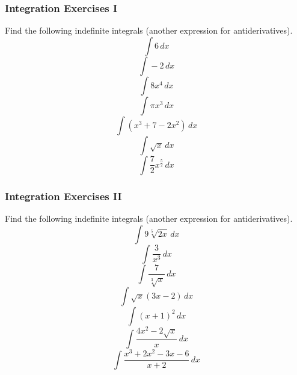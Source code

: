 \documentclass[xcolor=dvipsnames]{beamer}
\begin{document}
\begin{frame}
  \frametitle{Integration Exercises I}
Find the following \alert{indefinite integrals} (another expression
for antiderivatives). 
\begin{equation}
  \label{eq:eevoomoh}
  \int{}6\,dx
\end{equation}
\begin{equation}
  \label{eq:eohauthu}
  \int{}-2\,dx
\end{equation}
\begin{equation}
  \label{eq:heizieta}
  \int{}8x^{4}\,dx
\end{equation}
\begin{equation}
  \label{eq:zohjieph}
  \int{}\pi{}x^{3}\,dx
\end{equation}
\begin{equation}
  \label{eq:oodaelad}
  \int{}\left(x^{3}+7-2x^{2}\right)\,dx
\end{equation}
\begin{equation}
  \label{eq:eeshooyo}
  \int{}\sqrt{x}\,dx
\end{equation}
\begin{equation}
  \label{eq:uafievai}
  \int{}\frac{7}{2}x^{\frac{5}{2}}\,dx
\end{equation}
\end{frame}

\begin{frame}
  \frametitle{Integration Exercises II}
Find the following \alert{indefinite integrals} (another expression
for antiderivatives). 
\begin{equation}
  \label{eq:igheivei}
  \int{}9\sqrt[5]{2x}\,dx
\end{equation}
\begin{equation}
  \label{eq:akahheju}
  \int{}\frac{3}{x^{3}}\,dx
\end{equation}
\begin{equation}
  \label{eq:zeifahce}
  \int{}\frac{7}{\sqrt[3]{x}}\,dx
\end{equation}
\begin{equation}
  \label{eq:afahthud}
  \int{}\sqrt{x}\left(3x-2\right)\,dx
\end{equation}
\begin{equation}
  \label{eq:desheiga}
  \int{}\left(x+1\right)^{2}\,dx
\end{equation}
\begin{equation}
  \label{eq:oongaiqu}
  \int{}\frac{4x^{2}-2\sqrt{x}}{x}\,dx
\end{equation}
\begin{equation}
  \label{eq:ahxiequo}
  \int{}\frac{x^{3}+2x^{2}-3x-6}{x+2}\,dx
\end{equation}
\end{frame}
\end{document}
